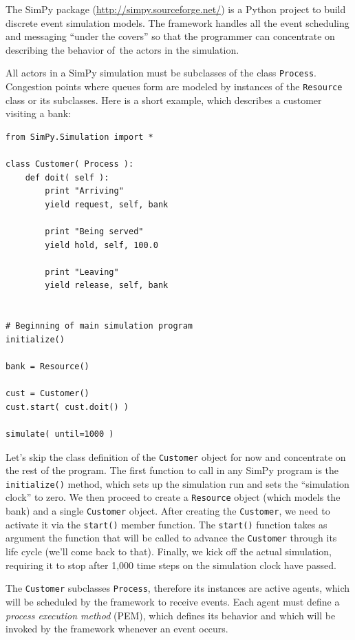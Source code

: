  
The SimPy package (\url{http://simpy.sourceforge.net/}) is a Python project to build discrete
event simulation models. The framework handles all the event scheduling and
messaging ``under the covers'' so that the programmer can concentrate
on describing the behavior of~the actors in the simulation.

All actors in a SimPy simulation must be subclasses of the class
\texttt{Process}. Congestion points where queues form are modeled by
instances of the \texttt{Resource} class or its subclasses.  Here is a
short example, which describes a customer visiting a bank:

\begin{verbatim}
from SimPy.Simulation import *

class Customer( Process ):
    def doit( self ):
        print "Arriving"
        yield request, self, bank

        print "Being served"
        yield hold, self, 100.0

        print "Leaving"
        yield release, self, bank


# Beginning of main simulation program
initialize()

bank = Resource()

cust = Customer()
cust.start( cust.doit() )

simulate( until=1000 )
\end{verbatim}

Let's skip the class definition of the \texttt{Customer} object for
now and concentrate on the rest of the program. The first function to
call in any SimPy program is the \texttt{initialize()} method, which
sets up the simulation run and sets the ``simulation clock'' to zero.
We then proceed to create a \texttt{Resource} object (which models the
bank) and a single \texttt{Customer} object. After creating the
\texttt{Customer}, we need to activate it via the \texttt{start()}
member function.  The \texttt{start()} function takes as argument the
function that will be called to advance the \texttt{Customer} through
its life cycle (we'll come back to that).  Finally, we kick off the
actual simulation, requiring it to stop after 1,000 time steps on the
simulation clock have passed.

The \texttt{Customer} subclasses \texttt{Process}, therefore its
instances are active agents, which will be scheduled by the framework
to receive events. Each agent must define a \emph{process execution
  method} (PEM), which defines its behavior and which will be invoked by
the framework whenever an event occurs.

